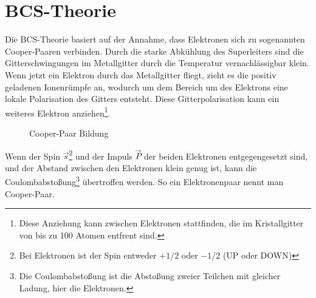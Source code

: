 \section{BCS-Theorie}
Die BCS-Theorie basiert auf der Annahme, dass Elektronen sich zu sogenannten Cooper-Paaren verbinden. 
Durch die starke Abkühlung des Superleiters sind die Gitterschwingungen im Metallgitter durch die Temperatur 
vernachlässigbar klein. Wenn jetzt ein Elektron durch das Metallgitter fliegt, zieht es die positiv geladenen
Ionenrümpfe an, wodurch um dem Bereich um des Elektrons eine lokale Polarisation des Gitters entsteht. Diese 
Gitterpolarisation kann ein weiteres Elektron anziehen\footnote{Diese Anziehung kann zwischen Elektronen stattfinden, die im Kristallgitter von bis zu 100 Atomen entfrent sind.}. 

\begin{figure}[!ht]
    \centering
    \caption{Cooper-Paar Bildung}
    \label{fig:CooperPaar}
\end{figure}
Wenn der Spin $\overrightarrow{s}$\footnote{Bei Elektronen ist der Spin entweder $+1/2$ oder $-1/2$ (UP oder DOWN)} und der Impuls $\overrightarrow{P}$ der beiden Elektronen entgegengesetzt sind, und der 
Abstand zwischen den Elektronen klein genug ist, kann die Coulombabstoßung\footnote{Die Coulombabstoßung ist die Abstoßung zweier Teilchen mit gleicher Ladung, hier die Elektronen.} übertroffen werden. So ein Elektronenpaar nennt man
Cooper-Paar. 

